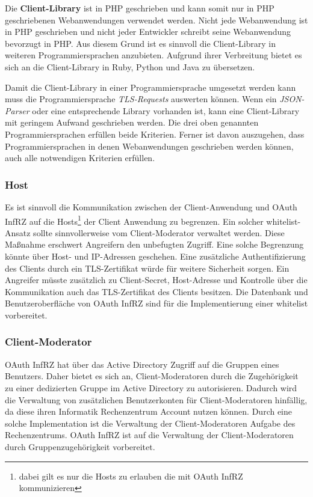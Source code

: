 \documentclass[12pt,a4paper,pointednumbers,abstracton]{scrartcl}
\begin{document}
Die \textbf{Client-Library} ist in PHP geschrieben und kann somit nur in PHP geschriebenen Webanwendungen verwendet werden.
Nicht jede Webanwendung ist in PHP geschrieben und nicht jeder Entwickler schreibt seine Webanwendung bevorzugt in PHP.
Aus diesem Grund ist es sinnvoll die Client-Library in weiteren Programmiersprachen anzubieten.
Aufgrund ihrer Verbreitung bietet es sich an die Client-Library in Ruby, Python und Java zu übersetzen.

Damit die Client-Library in einer Programmiersprache umgesetzt werden kann muss die Programmiersprache \emph{TLS-Requests} auswerten können.
Wenn ein \emph{JSON-Parser} oder eine entsprechende Library vorhanden ist, kann eine Client-Library mit geringem Aufwand geschrieben werden.
Die drei oben genannten Programmiersprachen erfüllen beide Kriterien.
Ferner ist davon auszugehen, dass Programmiersprachen in denen Webanwendungen geschrieben werden können, auch alle notwendigen Kriterien erfüllen. 

\subsubsection{Host}
\label{sec:oauth-infrz/host}

Es ist sinnvoll die Kommunikation zwischen der Client-Anwendung und OAuth InfRZ auf die Hosts\footnote{dabei gilt es nur die Hosts zu erlauben die mit OAuth InfRZ kommunizieren} der Client Anwendung zu begrenzen.
Ein solcher whitelist-Ansatz sollte sinnvollerweise vom Client-Moderator verwaltet werden.
Diese Maßnahme erschwert Angreifern den unbefugten Zugriff.
Eine solche Begrenzung könnte über Host- und IP-Adressen geschehen.
Eine zusätzliche Authentifizierung des Clients durch ein TLS-Zertifikat würde für weitere Sicherheit sorgen.
Ein Angreifer müsste zusätzlich zu Client-Secret, Host-Adresse und Kontrolle über die Kommunikation auch das TLS-Zertifikat des Clients besitzen.
Die Datenbank und Benutzeroberfläche von OAuth InfRZ sind für die Implementierung einer whitelist vorbereitet.

\subsubsection{Client-Moderator}
\label{sec:oauth-infrz/moderator}

OAuth InfRZ hat über das Active Directory Zugriff auf die Gruppen eines Benutzers.
Daher bietet es sich an, Client-Moderatoren durch die Zugehörigkeit zu einer dedizierten Gruppe im Active Directory zu autorisieren.
Dadurch wird die Verwaltung von zusätzlichen Benutzerkonten für Client-Moderatoren hinfällig, da diese ihren Informatik Rechenzentrum Account nutzen können.
Durch eine solche Implementation ist die Verwaltung der Client-Moderatoren Aufgabe des Rechenzentrums.
OAuth InfRZ ist auf die Verwaltung der Client-Moderatoren durch Gruppenzugehörigkeit vorbereitet.
\end{document}
